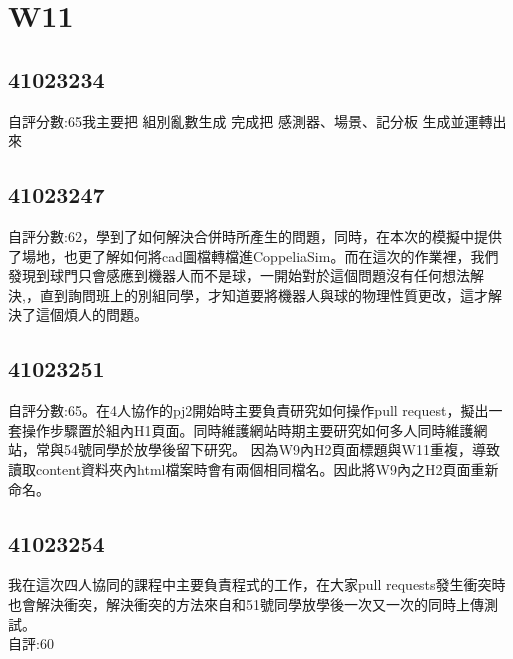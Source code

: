 \chapter{W11}


\section{41023234}
自評分數:65 我主要把  組別亂數生成  完成把  感測器、場景、記分板  生成並運轉出來


\section{41023247}
自評分數:62，學到了如何解決合併時所產生的問題，同時，在本次的模擬中提供了場地，也更了解如何將cad圖檔轉檔進CoppeliaSim。而在這次的作業裡，我們發現到球門只會感應到機器人而不是球，一開始對於這個問題沒有任何想法解決,，直到詢問班上的別組同學，才知道要將機器人與球的物理性質更改，這才解決了這個煩人的問題。

\section{41023251}
自評分數:65。在4人協作的pj2開始時主要負責研究如何操作pull request，擬出一套操作步驟置於組內H1頁面。同時維護網站時期主要研究如何多人同時維護網站，常與54號同學於放學後留下研究。
因為W9內H2頁面標題與W11重複，導致讀取content資料夾內html檔案時會有兩個相同檔名。因此將W9內之H2頁面重新命名。

\section{41023254}
我在這次四人協同的課程中主要負責程式的工作，在大家pull requests發生衝突時也會解決衝突，解決衝突的方法來自和51號同學放學後一次又一次的同時上傳測試。\\自評:60